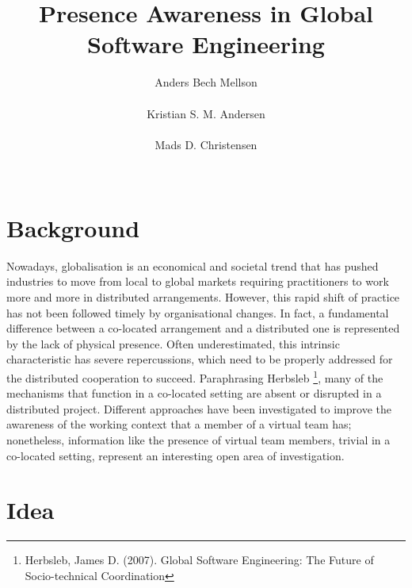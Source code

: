 \documentclass{sigchi}
\begin{document}
\title{Presence Awareness in Global Software Engineering}

\author{
  \alignauthor Anders Bech Mellson\\
    \\
  \alignauthor Kristian S. M. Andersen\\
    \\
  \alignauthor Mads D. Christensen\\
    \\
}

\maketitle



\section{Background}

Nowadays, globalisation is an economical and societal trend that has pushed industries to move from local to global markets requiring practitioners to work more and more in distributed arrangements.  However, this rapid shift of practice has not been followed timely by organisational changes. In fact, a fundamental difference between a co-located arrangement and a distributed one is represented by the lack of physical presence.  Often underestimated, this intrinsic characteristic has severe repercussions, which need to be properly addressed for the distributed cooperation to succeed.
Paraphrasing Herbsleb \footnote{Herbsleb, James D. (2007). Global Software Engineering: The Future of Socio-technical Coordination}, many of the mechanisms that function in a co-located setting are absent or disrupted in a distributed project. Different approaches have been investigated to improve the awareness of the working context that a member of a virtual team has; nonetheless, information like the presence of virtual team members, trivial in a co-located setting, represent an interesting open area of investigation.

\section{Idea}
\end{document}
